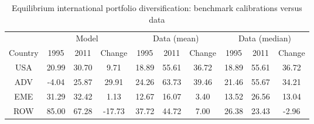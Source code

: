 \begin{table}[p]
\begin{center}
\caption{Equilibrium international portfolio diversification: benchmark calibrations versus data}
\label{tab:results-div-bench-data}
\small
\begin{tabular}{cccccccccc}
\toprule
& \multicolumn{3}{c}{Model} & \multicolumn{3}{c}{Data (mean)} & \multicolumn{3}{c}{Data (median)}\\
\cmidrule(rl){2-4}\cmidrule(rl){5-7}\cmidrule(rl){8-10}
Country & 1995 & 2011 & Change & 1995 & 2011 & Change & 1995 & 2011 & Change\\
\midrule
USA&20.99&30.70&9.71&18.89&55.61&36.72&18.89&55.61&36.72\\
ADV&-4.04&25.87&29.91&24.26&63.73&39.46&21.46&55.67&34.21\\
EME&31.29&32.42&1.13&12.67&16.07&3.40&13.52&26.56&13.04\\
ROW&85.00&67.28&-17.73&37.72&44.72&7.00&26.38&23.43&-2.96\\
\bottomrule
\end{tabular}
\normalsize
\end{center}
\end{table}
